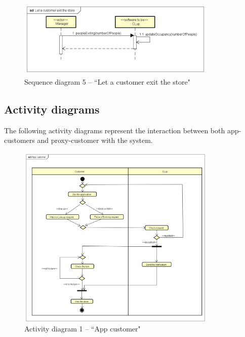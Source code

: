 \documentclass[a4paper,oneside,11pt]{book}   %
\begin{document}
    \begin{figure}[H]
        \centering
        \includegraphics[width=0.85\textwidth, keepaspectratio]{pictures/sequence_diagrams/let_customer_exit_store}
        \caption{Sequence diagram 5 -- ``Let a customer exit the store"}
        \label{figure:sequence_diagram_5_let_customer_exit_store}
    \end{figure}
    
    \subsection{Activity diagrams}
    The following activity diagrams represent the interaction between both app-customers and proxy-customer with the system.
    
    \begin{figure}[H]
        \centering
        \includegraphics[width=0.85\textwidth, keepaspectratio]{pictures/activity_diagrams/app_customer}
        \caption{Activity diagram 1 -- ``App customer"}
        \label{figure:activity_diagram_1_app_customer}
    \end{figure}
    
\end{document}
